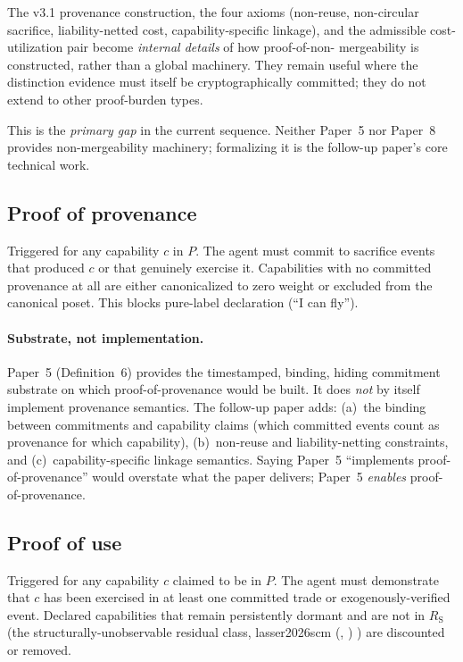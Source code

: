 \documentclass{article}
\makeatletter
\newcommand{\citep}[2][]{%
  \begingroup
  \def\@tmpkey{#2}%
  \ifx\@tmpkey\@empty\else
    (\ifx\@empty#1\@empty\else #1, \fi
     \@nameuse{bibkey@\@tmpkey})%
  \fi
  \endgroup
}
\newcommand{\ResS}{R_{\mathrm{S}}}
\makeatother
\begin{document}
The v3.1 provenance construction, the four axioms (non-reuse,
non-circular sacrifice, liability-netted cost,
capability-specific linkage), and the admissible cost-utilization
pair become \emph{internal details} of how proof-of-non-
mergeability is constructed, rather than a global machinery.
They remain useful where the distinction evidence must itself be
cryptographically committed; they do not extend to other
proof-burden types.

This is the \emph{primary gap} in the current sequence.  Neither
Paper~5 nor Paper~8 provides non-mergeability machinery;
formalizing it is the follow-up paper's core technical work.

\subsection{Proof of provenance}

Triggered for any capability $c$ in $P$.  The agent must commit
to sacrifice events that produced $c$ or that genuinely exercise
it.  Capabilities with no committed provenance at all are either
canonicalized to zero weight or excluded from the canonical
poset.  This blocks pure-label declaration (``I can fly'').

\paragraph{Substrate, not implementation.}
Paper~5 (Definition~6) provides the timestamped, binding, hiding
commitment substrate on which proof-of-provenance would be
built.  It does \emph{not} by itself implement provenance
semantics.  The follow-up paper adds: (a)~the binding between
commitments and capability claims (which committed events count
as provenance for which capability), (b)~non-reuse and
liability-netting constraints, and (c)~capability-specific
linkage semantics.  Saying Paper~5 ``implements
proof-of-provenance'' would overstate what the paper delivers;
Paper~5 \emph{enables} proof-of-provenance.

\subsection{Proof of use}

Triggered for any capability $c$ claimed to be in $P$.  The agent
must demonstrate that $c$ has been exercised in at least one
committed trade or exogenously-verified event.  Declared
capabilities that remain persistently dormant and are not in
$\ResS$ (the structurally-unobservable residual class,
\citep{lasser2026scm}) are discounted or removed.
\end{document}
